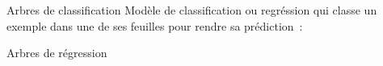 \begin{frame}{Arbres de classification}
  Modèle de classification ou regréssion qui classe un exemple dans une de ses feuilles pour rendre sa prédiction~:
\end{frame}

\begin{frame}{Arbres de régression}
\end{frame}

